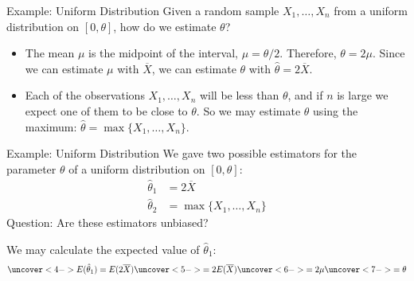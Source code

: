 \documentclass{beamer}
\begin{document}
\begin{frame}{Example: Uniform Distribution}
Given a random sample $X_1,\dots,X_n$ from a uniform distribution on $[0,\theta]$, how do we estimate $\theta$?

\begin{itemize}
\pause\item The mean $\mu$ is the midpoint of the interval, $\mu=\theta/2$. Therefore, $\theta=2\mu$. Since we can estimate $\mu$ with $\overline{X}$, we can estimate $\theta$ with $\hat\theta = 2\overline{X}$.
\pause\item Each of the observations $X_1,\dots,X_n$ will be less than $\theta$, and if $n$ is large we expect one of them to be close to $\theta$. So we may estimate $\theta$ using the maximum: $\hat\theta = \max\{X_1,\dots,X_n\}$.
\end{itemize}
\end{frame}

\begin{frame}{Example: Uniform Distribution}
We gave two possible estimators for the parameter $\theta$ of a uniform distribution on $[0,\theta]$:
\begin{align*}
\hat\theta_1 &= 2\overline{X} \\
\hat\theta_2 &= \max\{X_1,\dots,X_n\}
\end{align*}
\pause Question: Are these estimators unbiased?

\vspace{.2cm}
\pause We may calculate the expected value of $\hat\theta_1$:
 \begin{align*}
\uncover<4->{E(\hat\theta_1) = E(2\overline{X})}
\uncover<5->{= 2E(\overline{X}) }
\uncover<6->{= 2\mu }
\uncover<7->{= \theta}
\end{align*}
\end{frame}
\end{document}
